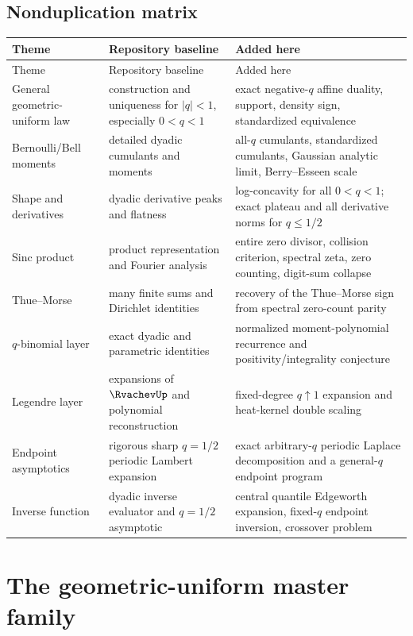 \documentclass[11pt,oneside]{article}
\theoremstyle{definition}
\theoremstyle{remark}
\begin{document}
\subsection{Nonduplication matrix}

\begin{longtable}{p{}p{}p{}}
\toprule
Theme & Repository baseline & Added here\\
\midrule
\endfirsthead
\toprule
Theme & Repository baseline & Added here\\
\midrule
\endhead
General geometric-uniform law & construction and uniqueness for $|q|<1$, especially $0<q<1$ & exact negative-$q$ affine duality, support, density sign, standardized equivalence\\
Bernoulli/Bell moments & detailed dyadic cumulants and moments & all-$q$ cumulants, standardized cumulants, Gaussian analytic limit, Berry--Esseen scale\\
Shape and derivatives & dyadic derivative peaks and flatness & log-concavity for all $0<q<1$; exact plateau and all derivative norms for $q\le1/2$\\
Sinc product & product representation and Fourier analysis & entire zero divisor, collision criterion, spectral zeta, zero counting, digit-sum collapse\\
Thue--Morse & many finite sums and Dirichlet identities & recovery of the Thue--Morse sign from spectral zero-count parity\\
$q$-binomial layer & exact dyadic and parametric identities & normalized moment-polynomial recurrence and positivity/integrality conjecture\\
Legendre layer & expansions of $\RvachevUp$ and polynomial reconstruction & fixed-degree $q\uparrow1$ expansion and heat-kernel double scaling\\
Endpoint asymptotics & rigorous sharp $q=1/2$ periodic Lambert expansion & exact arbitrary-$q$ periodic Laplace decomposition and a general-$q$ endpoint program\\
Inverse function & dyadic inverse evaluator and $q=1/2$ asymptotic & central quantile Edgeworth expansion, fixed-$q$ endpoint inversion, crossover problem\\
\bottomrule
\end{longtable}

\section{The geometric-uniform master family}
\end{document}
